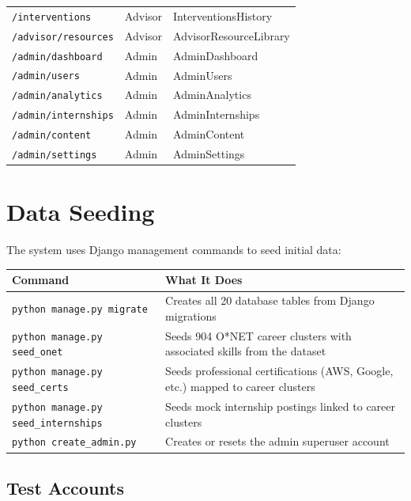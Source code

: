 \documentclass[12pt, a4paper]{article}
\begin{document}
\begin{longtable}{p{4.5cm}p{2.5cm}p{7cm}}
\texttt{/interventions} & Advisor & InterventionsHistory \\
\texttt{/advisor/resources} & Advisor & AdvisorResourceLibrary \\
\midrule
\texttt{/admin/dashboard} & Admin & AdminDashboard \\
\texttt{/admin/users} & Admin & AdminUsers \\
\texttt{/admin/analytics} & Admin & AdminAnalytics \\
\texttt{/admin/internships} & Admin & AdminInternships \\
\texttt{/admin/content} & Admin & AdminContent \\
\texttt{/admin/settings} & Admin & AdminSettings \\
\bottomrule
\end{longtable}

\newpage

\section{Data Seeding}

The system uses Django management commands to seed initial data:

\begin{longtable}{p{5.5cm}p{8.5cm}}
\toprule
\textbf{Command} & \textbf{What It Does} \\
\midrule
\endhead
\texttt{python manage.py migrate} & Creates all 20 database tables from Django migrations \\
\texttt{python manage.py seed\_onet} & Seeds 904 O*NET career clusters with associated skills from the dataset \\
\texttt{python manage.py seed\_certs} & Seeds professional certifications (AWS, Google, etc.) mapped to career clusters \\
\texttt{python manage.py seed\_internships} & Seeds mock internship postings linked to career clusters \\
\texttt{python create\_admin.py} & Creates or resets the admin superuser account \\
\bottomrule
\end{longtable}

\subsection{Test Accounts}
\end{document}
